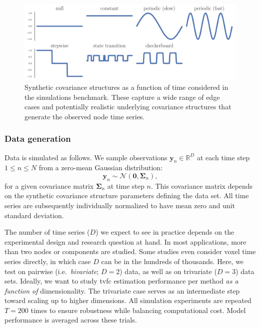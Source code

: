\begin{figure}[t]
  \centering
  \includegraphics[width=\textwidth]{fig/sim/covariance_structures}
  \caption{
    Synthetic covariance structures as a function of time considered in the simulations benchmark.
    These capture a wide range of edge cases and potentially realistic underlying covariance structures that generate the observed node time series.
  }\label{fig:synthetic-covariance-structures}
\end{figure}


\subsubsection{Data generation}

Data is simulated as follows.
We sample observations $\mathbf{y}_n \in \mathbb{R}^D$ at each time step~$1 \leq n \leq N$ from a zero-mean Gaussian distribution:
\begin{equation}
  \mathbf{y}_n \sim \mathcal{N}(\mathbf{0}, \mathbf{\Sigma}_n),
  \label{eq:data-generation}
\end{equation}
for a given covariance matrix $\mathbf{\Sigma}_n$ at time step $n$.
This covariance matrix depends on the synthetic covariance structure parameters defining the data set.
All time series are subsequently individually normalized to have mean zero and unit standard deviation.

The number of time series ($D$) we expect to see in practice depends on the experimental design and research question at hand.
In most applications, more than two nodes or components are studied.
Some studies even consider voxel time series directly, in which case $D$ can be in the hundreds of thousands.
Here, we test on pairwise (i.e.~\emph{bivariate}; $D = 2$) data, as well as on trivariate ($D = 3$) data sets.
Ideally, we want to study \gls{tvfc} estimation performance per method \emph{as a function of} dimensionality.
The trivariate case serves as an intermediate step toward scaling up to higher dimensions.
All simulation experiments are repeated $T = 200$ times to ensure robustness while balancing computational cost.
Model performance is averaged across these trials.

